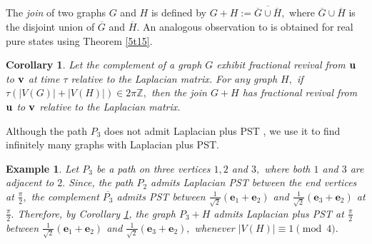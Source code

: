\documentclass[12pt,a4paper]{article}
\newtheorem{lem}{Lemma}
\newtheorem{cor}{Corollary}
\newtheorem{exm}{Example}
\def \e {{\bf e}}
\def \u {{\bf u}}
\def \v {{\bf v}}
\def \e {{\mathbf e}}
\newcommand{\ob}[1]{\left(#1\right)}
\begin{document}
The \emph{join} of two graphs $G$ and $H$ is defined by $G+H:=\overline{\overline{G}\cup\overline{H}},$ where $\overline{G}\cup\overline{H}$ is the disjoint union of $\overline{G}$ and $\overline{H}.$ An analogous observation to \cite[Corollary 10]{chan3} is obtained for real pure states using Theorem \ref{5t15}. 
 \begin{cor}\label{5c3}
 Let the complement of a graph $G$ exhibit fractional revival from $\u$ to $\v$ at time $\tau$ relative to the Laplacian matrix. For any graph $H,$ if $\tau(|V(G)|+|V(H)|)\in 2\pi\mathbb{Z},$
 then the join $G + H$ has fractional revival from $\u$ to $\v$ relative to the Laplacian matrix.
 \end{cor}
 Although the path $P_3$ does not admit Laplacian plus PST \cite[Corollary 7.8]{god7}, we use it to find infinitely many graphs with Laplacian plus PST. 
\begin{exm}\label{5ex1}
Let $P_3$ be a path on three vertices $1,2$ and $3,$ where both $1$ and $3$ are adjacent to $2.$ Since, the path $P_2$ admits Laplacian PST between the end vertices at $\frac{\pi}{2},$ the complement $\overline{P_3}$ admits PST between $\frac{1}{\sqrt{2}}\ob{\e_1+\e_2}$ and $\frac{1}{\sqrt{2}}\ob{\e_3+\e_2}$  at $\frac{\pi}{2}.$ Therefore, by Corollary \ref{5c3},
the graph $P_3+H$ admits Laplacian plus PST at $\frac{\pi}{2}$ between $\frac{1}{\sqrt{2}}\ob{\e_1+\e_2}$ and $\frac{1}{\sqrt{2}}\ob{\e_3+\e_2},$ whenever $|V(H)|\equiv 1 \pmod 4.$ 
\end{exm}
    
\end{document}
